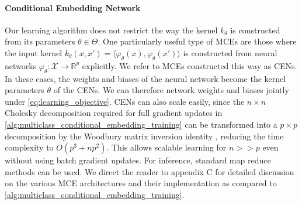 \documentclass[twoside]{article}
\begin{document}
		\paragraph{Conditional Embedding Network} Our learning algorithm does not restrict the way the kernel $k_{\theta}$ is constructed from its parameters $\theta \in \Theta$. One particularly useful type of \glspl{MCE} are those where the input kernel $k_{\theta}(x, x') = \langle \varphi_{\theta}(x), \varphi_{\theta}(x') \rangle$ is constructed from neural networks $\varphi_{\theta} : \mathcal{X} \to \mathbb{R}^{p}$ explicitly. We refer to \glspl{MCE} constructed this way as \glspl{CEN}. In these cases, the weights and biases of the neural network become the kernel parameters $\theta$ of the \glspl{CEN}. We can therefore network weights and biases jointly under \eqref{eq:learning_objective}. \glspl{CEN} can also scale easily, since the $n \times n$ Cholesky decomposition required for full gradient updates in \cref{alg:multiclass_conditional_embedding_training} can be transformed into a $p \times p$ decomposition by the Woodbury matrix inversion identity \citep{higham2002accuracy}, reducing the time complexity to $O(p^{3} + np^{2})$. This allows scalable learning for $n >> p$ even without using batch gradient updates. For inference, standard map reduce methods can be used. We direct the reader to appendix C for detailed discussion on the various \gls{MCE} architectures and their implementation as compared to \cref{alg:multiclass_conditional_embedding_training}. 
		
		
\end{document}
